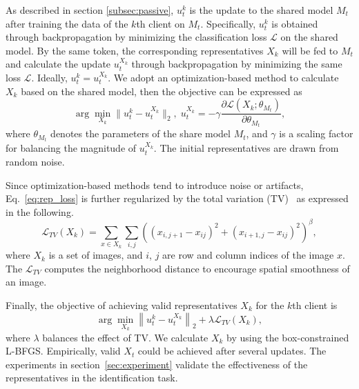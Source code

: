 \documentclass[10pt, conference, letterpaper]{IEEEtran}
\begin{document}
As described in section \ref{subsec:passive}, $u^k_t$ is the update to the shared model $M_t$ after training the data of the $k$th client on $M_t$. Specifically, $u^k_t$ is obtained through backpropagation by minimizing the classification loss $\mathcal{L}$ on the shared model. By the same token, the corresponding representatives $X_k$ will be fed to $M_t$ and calculate the update $u^{X_k}_t$ through backpropagation by minimizing the same loss $\mathcal{L}$. Ideally, $u^k_t = u^{X_k}_t$. We adopt an optimization-based method to calculate $X_k$ based on the shared model, then the objective can be expressed as
\begin{equation}
\arg\underset{X_k}{\min}\| u_t^k - u^{X_k}_t \|_2,\; u^{X_k}_t = - \gamma \frac{\partial\mathcal{L}(X_k ; \theta_{M_t})}{\partial\theta_{M_t}},
\label{eq:rep_loss}
\end{equation}
where $\theta_{M_t}$ denotes the parameters of the share model $M_t$, and $\gamma$ is a scaling factor for balancing the magnitude of $u^{X_k}_t$. The initial representatives are drawn from random noise. %

Since optimization-based methods tend to introduce noise or artifacts, Eq.~\ref{eq:rep_loss} is further regularized by the total variation (TV)~\cite{mahendran2015understanding} as expressed in the following.
\begin{equation}
\mathcal{L}_{TV}(X_k) = \sum_{x\in X_k} \sum_{i,j}
\left( (x_{i,j+1}-x_{ij})^2+(x_{i+1,j} - x_{ij})^2 \right) ^ \beta,
\label{eq:rep_tv}
\end{equation}
where $X_k$ is a set of images, and $i$, $j$ are row and column indices of the image $x$.
The $\mathcal{L}_{TV}$ computes the neighborhood distance to encourage spatial smoothness of an image.

Finally, the objective of achieving valid representatives $X_k$ for the $k$th client is
\begin{equation}
\arg\underset{X_k}{\min}\left\| u_t^k - u^{X_k}_t \right\|_2 + \lambda \mathcal{L}_{TV}(X_k),
\label{eq:loss_total}
\end{equation}
where $\lambda$ balances the effect of TV. We calculate $X_k$ by using the box-constrained L-BFGS.
Empirically, valid $X_t$ could be achieved after several updates. The experiments in section~\ref{sec:experiment} validate the effectiveness of the representatives in the identification task.
\end{document}

